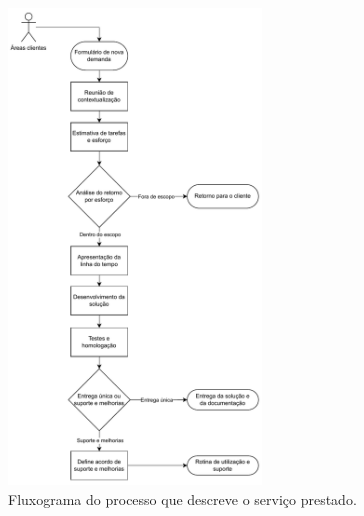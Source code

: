 	\begin{figure}[!tb]
		\centering
		\includegraphics[width=0.6\textwidth]{./figuras/processFlow.pdf}
		\caption{Fluxograma do processo que descreve o serviço prestado.}
		\label{fig:metodologia:processFlow}
	\end{figure}

